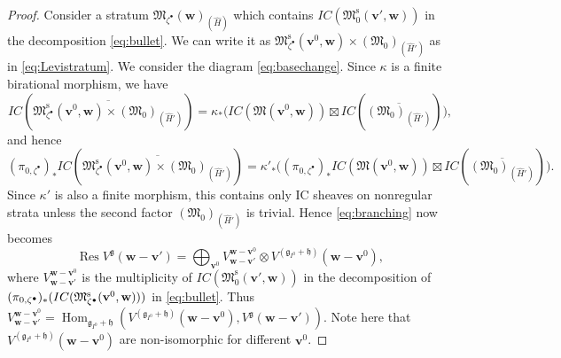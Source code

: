 \documentclass[10pt,a4paper]{amsart}
\theoremstyle{definition}
\numberwithin{equation}{section}
\newcommand{\g}{{\mathfrak g}}
\newcommand{\Hom}{\operatorname{Hom}}
\newcommand{\M}{{\mathfrak M}} %
\newcommand{\Mreg}{\M^{\operatorname{s}}}
\newcommand{\bv}{{\mathbf v}} %
\newcommand{\bw}{{\mathbf w}} %
\begin{document}
\begin{proof}
Consider a stratum $\M_{\zeta^\bullet}(\bw)_{(\widehat H)}$ which
contains $IC(\Mreg_0(\bv',\bw))$ in the decomposition
\eqref{eq:bullet}. We can write it as
$\Mreg_{\zeta^\bullet}(\bv^0,\bw)\times (\M_0)_{(\widehat H')}$ as in
\eqref{eq:Levistratum}. We consider the diagram
\eqref{eq:basechange}. Since $\kappa$ is a f\/inite birational morphism,
we have
\begin{equation*}
  IC(\overline{\Mreg_{\zeta^\bullet}(\bv^0,\bw)
     \times (\M_0)_{(\widehat H')}})
   = \kappa_*\big(
     IC(\M(\bv^0,\bw))\boxtimes IC(\overline{(\M_0)_{(\widehat H')}})
   \big),
\end{equation*}
and hence
\begin{equation*}\label{eq:nonregular}
  (\pi_{0,\zeta^\bullet})_* IC(\overline{\Mreg_{\zeta^\bullet}(\bv^0,\bw)
     \times (\M_0)_{(\widehat H')}}) = \kappa'_*\big(
   (\pi_{0,\zeta^\bullet})_*IC(\M(\bv^0,\bw))\boxtimes
   IC(\overline{(\M_0)_{(\widehat H')}})\big).
\end{equation*}
Since $\kappa'$ is also a f\/inite morphism, this contains only IC
sheaves on nonregular strata unless the second factor
$(\M_0)_{(\widehat H')}$ is trivial.
%
Hence \eqref{eq:branching} now becomes
\begin{equation}\label{eq:restriction}
   \operatorname{Res} V^{\g}(\bw - \bv')
   = \bigoplus_{\bv^0} V_{\bw-\bv'}^{\bw-\bv^0}
   \otimes V^{(\g_{I^0}+\mathfrak h)}(\bw - \bv^0),
\end{equation}
where $V_{\bw-\bv'}^{\bw-\bv^0}$ is the multiplicity of
$IC(\Mreg_0(\bv',\bw))$ in the decomposition of\linebreak[2]
$(\pi_{0,\zeta^\bullet})_*\linebreak[2](IC(\Mreg_{\zeta^\bullet}(\bv^0,
\linebreak[2]\bw)))$ in
\eqref{eq:bullet}. Thus
$V_{\bw-\bv'}^{\bw-\bv^0} =
\Hom_{\g_{I^0}+\mathfrak h}
(V^{(\g_{I^0}+\mathfrak h)}(\bw - \bv^0), V^\g(\bw-\bv'))$.
%
Note here that $V^{(\g_{I^0}+\mathfrak h)}(\bw - \bv^0)$ are
non-isomorphic for dif\/ferent $\bv^0$.
\end{proof}
\end{document}

